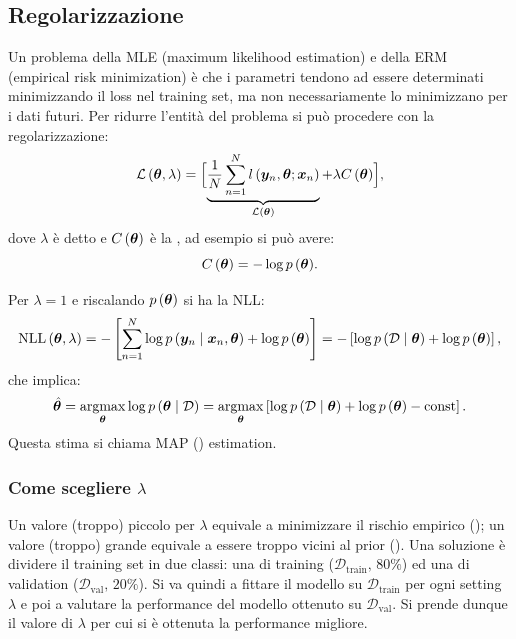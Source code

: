 \documentclass[10pt]{article}
\DeclareMathOperator{\NLL}{NLL}
\newcommand{\pare}[1]{
	\ensuremath{\left(#1\right)}
}
\newcommand{\spare}[1]{
	\ensuremath{\left[#1\right]}
}
\begin{document}
\subsection{Regolarizzazione}
Un problema della MLE (maximum likelihood estimation) e della ERM (empirical
risk minimization) è che i parametri tendono ad essere determinati minimizzando
il loss nel training set, ma non necessariamente lo minimizzano per i dati
futuri. Per ridurre l'entità del problema si può procedere con la
regolarizzazione:
\begin{equation}
\mathcal{L}\pare{\ve{\theta}, \lambda} = \Bigl[ \underbrace{\frac{1}{N}\sum_{n=1}^N l\pare{\ve{y}_n, \ve{\theta}; \ve{x}_n}}_{\mathcal{L}\pare{\ve{\theta}}} + \lambda C\pare{\ve{\theta}} \Bigr],
\end{equation}
dove $\lambda$ è detto  e $C\pare{\ve{\theta}}$ è
la , ad esempio si può avere:
\[
C\pare{\ve{\theta}} = -\log{p\pare{\ve{\theta}}}.
\]

Per \(\lambda = 1\) e riscalando \(p\pare{\ve{\theta}}\) si ha la NLL:
\begin{equation}
\NLL\pare{\ve{\theta}, \lambda} = - \spare{\sum_{n=1}^N\log{p\pare{\ve{y}_n\cond\ve{x}_n,\ve{\theta}}} + \log{p\pare{\ve{\theta}}}} = -\spare{\log{p\pare{\mathcal{D}\cond\ve{\theta}}} + \log{p\pare{\ve{\theta}}}},
\end{equation}
che implica:
\begin{equation}
\hat{\ve{\theta}} = \argmax_{\ve{\theta}}\log{p\pare{\ve{\theta}\cond\mathcal{D}}} = \argmax_{\ve{\theta}}\spare{\log{p\pare{\mathcal{D}\cond\ve{\theta}}} + \log{p\pare{\ve{\theta}}} - \text{const}}.
\end{equation}
Questa stima si chiama MAP () estimation.


\subsubsection{Come scegliere \(\lambda\)}
Un valore (troppo) piccolo per \(\lambda\) equivale a minimizzare il rischio
empirico (); un valore (troppo) grande equivale a essere troppo
vicini al prior (). Una soluzione è dividere il training set in
due classi: una di training ($\mathcal{D}_{\text{train}},\,80\%$) ed una di
validation ($\mathcal{D}_{\text{val}},\,20\%$). Si va quindi a fittare il
modello su $\mathcal{D}_{\text{train}}$ per ogni setting $\lambda$ e poi a
valutare la performance del modello ottenuto su $\mathcal{D}_{\text{val}}$. Si
prende dunque il valore di $\lambda$ per cui si è ottenuta la performance
migliore.
\end{document}
